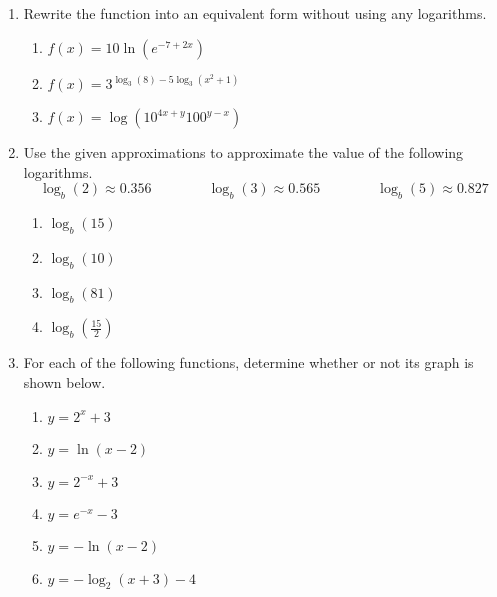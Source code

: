 \begin{enumerate}
\begin{enumerate}
\end{enumerate}




\clearpage


\item Rewrite the function into an equivalent form without using any
  logarithms.
\begin{enumerate}
\item $ \displaystyle f(x) = 10 \ln(e^{-7+2x})$ \\[.5in]
\item $\displaystyle f(x)=3^{\log_3(8)-5 \log_3(x^2+1)}$ \\[1in]

\item $f(x) = \log ({10}^{4x+y}{100}^{y-x})$ \\[1in]
\end{enumerate}


\item Use the given approximations to approximate the value of the following logarithms.
$$\log_b(2)\approx 0.356 \quad \quad \quad \quad \log_b(3)\approx 0.565 \quad \quad \quad \quad \log_b(5)\approx 0.827$$

\begin{enumerate}
\item $\log_b(15)$\vfill
\item $\log_b(10)$\vfill
\item $\log_b(81)$\vfill
\item $\displaystyle \log_b\left(\frac{15}{2}\right)$\vfill
\end{enumerate}




\clearpage

\item  For each of the following functions, determine whether or not its graph is shown below.

\begin{multicols}{3}
\begin{enumerate}
	\item $y=2^x+3$
	\item $y=\ln(x-2)$
	\item $y = 2^{-x}+3$
	\item $y=e^{-x}-3$
	\item $y=-\ln(x-2)$
	\item $y=-\log_2(x+3)-4$
\end{enumerate}	
\end{multicols}



\end{enumerate}

